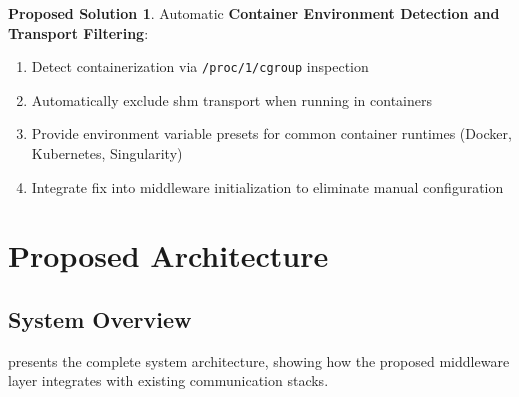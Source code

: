 \documentclass[11pt,letterpaper]{article}
\theoremstyle{definition}
\newtheorem{solution}{Proposed Solution}
\begin{document}
\begin{solution}
Automatic \textbf{Container Environment Detection and Transport Filtering}:
\begin{enumerate}
    \item Detect containerization via \texttt{/proc/1/cgroup} inspection
    \item Automatically exclude shm transport when running in containers
    \item Provide environment variable presets for common container runtimes (Docker, Kubernetes, Singularity)
    \item Integrate fix into middleware initialization to eliminate manual configuration
\end{enumerate}
\end{solution}

\section{Proposed Architecture}

\subsection{System Overview}

 presents the complete system architecture, showing how the proposed middleware layer integrates with existing communication stacks.
\end{document}
